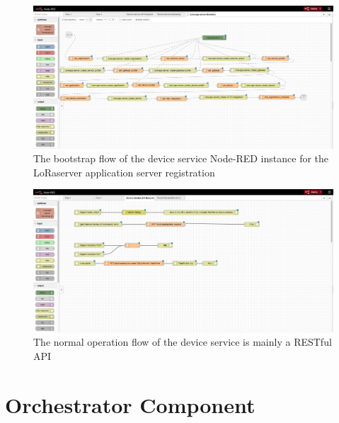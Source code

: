 \begin{figure}
    \centering
    \includegraphics[width=\textwidth]{images/nodered_devserv_boot2.png}
    \caption{The bootstrap flow of the device service Node-RED instance for the LoRaserver application server registration}
    \label{fig:devserv-boot2}
\end{figure}

\begin{figure}
    \centering
    \includegraphics[width=\textwidth]{images/nodered_devserv_api.png}
    \caption{The normal operation flow of the device service is mainly a RESTful API}
    \label{fig:devserv-norm}
\end{figure}

\clearpage

\section{Orchestrator Component}

